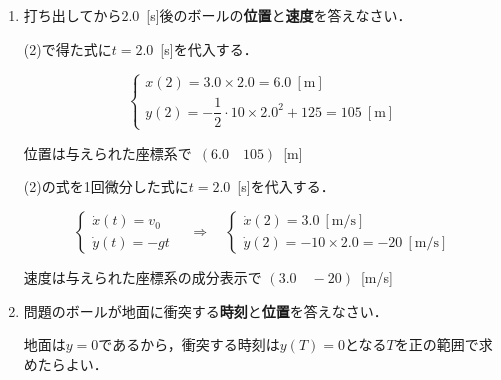 \documentclass[a4paper,11pt]{ltjsarticle}
\begin{document}
\begin{enumerate}[label={\LARGE \Roman*}]
\begin{enumerate}[label=(\arabic*)]
        \vspace{5pt}

        \item 打ち出してから$2.0$\ [s]後のボールの\textbf{位置}と\textbf{速度}を答えなさい．

        \vspace{5pt}

        (2)で得た式に$t=2.0$\ [s]を代入する．

        \begin{equation}
            \begin{cases}
                x(2)=3.0 \times 2.0=6.0\ [\mathrm{m}] \\
                y(2)=-\dfrac{1}{2} \cdot 10 \times 2.0^2+125=105\ [\mathrm{m}]
            \end{cases}
        \end{equation}

        位置は与えられた座標系で\ $(6.0 \quad 105)$\ [m]

        \vspace{5pt}

        (2)の式を1回微分した式に$t=2.0$\ [s]を代入する．

        \begin{equation}
            \begin{cases}
                \dot{x}(t)=v_0 \\
                \dot{y}(t)=-gt
            \end{cases}
            \quad \Rightarrow \quad
            \begin{cases}
                \dot{x}(2)=3.0\ [\mathrm{m/s}] \\
                \dot{y}(2)=-10 \times 2.0 = -20\ [\mathrm{m/s}]
            \end{cases}
        \end{equation}

        速度は与えられた座標系の成分表示で $(3.0 \quad -20)$\ [m/s]

        \clearpage

        \item 問題のボールが地面に衝突する\textbf{時刻}と\textbf{位置}を答えなさい．
        
        \vspace{5pt}

        地面は$y=0$であるから，衝突する時刻は$y(T)=0$となる$T$を正の範囲で求めたらよい．

        \vspace{-15pt}


\end{enumerate}
\end{enumerate}
\end{document}
